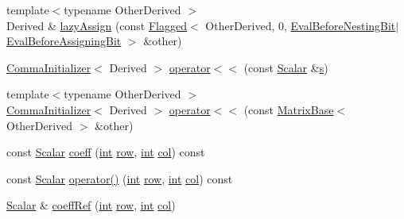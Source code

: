 \begin{DoxyCompactItemize}
\item 
{\footnotesize template$<$typename Other\-Derived $>$ }\\Derived \& \hyperlink{class_matrix_base_ae7b3e125189f752b9360fae8933bc9fd}{lazy\-Assign} (const \hyperlink{class_flagged}{Flagged}$<$ Other\-Derived, 0, \hyperlink{group__flags_gaf8ad6e2956f7368b8e3f7407e2319e63}{Eval\-Before\-Nesting\-Bit}$|$\hyperlink{group__flags_gadc8925e67a5a54bd479d6f587112e19a}{Eval\-Before\-Assigning\-Bit} $>$ \&other)
\item 
\hyperlink{struct_comma_initializer}{Comma\-Initializer}$<$ Derived $>$ \hyperlink{class_matrix_base_a6a6d785c96bfdfbd1d6947e0d3ab4cfd}{operator$<$$<$} (const \hyperlink{class_matrix_base_a625df8339dc2d816cbc0fd66e7dadaf5}{Scalar} \&\hyperlink{glext_8h_ad585a1393cfa368fa9dc3d8ebff640d5}{s})
\item 
{\footnotesize template$<$typename Other\-Derived $>$ }\\\hyperlink{struct_comma_initializer}{Comma\-Initializer}$<$ Derived $>$ \hyperlink{class_matrix_base_a24428c1049caac8a6b95487d9943d40c}{operator$<$$<$} (const \hyperlink{class_matrix_base}{Matrix\-Base}$<$ Other\-Derived $>$ \&other)
\item 
const \hyperlink{class_matrix_base_a625df8339dc2d816cbc0fd66e7dadaf5}{Scalar} \hyperlink{class_matrix_base_ab256cf86336c19de77024a6dd0f9cef0}{coeff} (\hyperlink{ioapi_8h_a787fa3cf048117ba7123753c1e74fcd6}{int} \hyperlink{glext_8h_a11b277b422822f784ee248b43eee3e1e}{row}, \hyperlink{ioapi_8h_a787fa3cf048117ba7123753c1e74fcd6}{int} \hyperlink{class_matrix_base_ae3c94b0f25b4273c7a8125169bdf60e0}{col}) const 
\item 
const \hyperlink{class_matrix_base_a625df8339dc2d816cbc0fd66e7dadaf5}{Scalar} \hyperlink{class_matrix_base_aeecb481d4f5f13a17a4ef74ac47e8dc9}{operator()} (\hyperlink{ioapi_8h_a787fa3cf048117ba7123753c1e74fcd6}{int} \hyperlink{glext_8h_a11b277b422822f784ee248b43eee3e1e}{row}, \hyperlink{ioapi_8h_a787fa3cf048117ba7123753c1e74fcd6}{int} \hyperlink{class_matrix_base_ae3c94b0f25b4273c7a8125169bdf60e0}{col}) const 
\item 
\hyperlink{class_matrix_base_a625df8339dc2d816cbc0fd66e7dadaf5}{Scalar} \& \hyperlink{class_matrix_base_afe68ed8e69b4b8ca335fc0bcc58097c4}{coeff\-Ref} (\hyperlink{ioapi_8h_a787fa3cf048117ba7123753c1e74fcd6}{int} \hyperlink{glext_8h_a11b277b422822f784ee248b43eee3e1e}{row}, \hyperlink{ioapi_8h_a787fa3cf048117ba7123753c1e74fcd6}{int} \hyperlink{class_matrix_base_ae3c94b0f25b4273c7a8125169bdf60e0}{col})
\item 

\end{DoxyCompactItemize}
